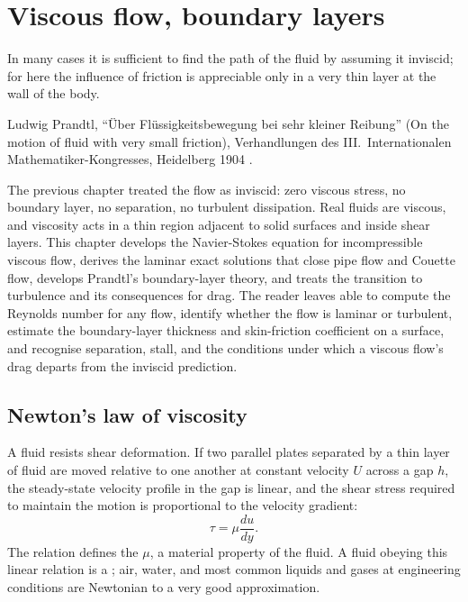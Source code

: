 \chapter{Viscous flow, boundary layers}
\label{vol03:ch12}

\epigraph{In many cases it is sufficient to find the path of the
fluid by assuming it inviscid; for here the influence of friction
is appreciable only in a very thin layer at the wall of the body.}{
Ludwig Prandtl, ``\"Uber Fl\"ussigkeitsbewegung bei sehr kleiner
Reibung'' (On the motion of fluid with very small friction),
Verhandlungen des III.\ Internationalen Mathematiker-Kongresses,
Heidelberg 1904 \cite[pp.~484--485]{paper:prandtl1904}.}


\noindent
The previous chapter treated the flow as inviscid: zero viscous
stress, no boundary layer, no separation, no turbulent dissipation.
Real fluids are viscous, and viscosity acts in a thin region
adjacent to solid surfaces and inside shear layers. This chapter
develops the Navier-Stokes equation for incompressible viscous
flow, derives the laminar exact solutions that close pipe flow
and Couette flow, develops Prandtl's boundary-layer theory, and
treats the transition to turbulence and its consequences for drag.
The reader leaves able to compute the Reynolds number for any
flow, identify whether the flow is laminar or turbulent, estimate
the boundary-layer thickness and skin-friction coefficient on a
surface, and recognise separation, stall, and the conditions under
which a viscous flow's drag departs from the inviscid prediction.

\section{Newton's law of viscosity}

A fluid resists shear deformation. If two parallel plates separated
by a thin layer of fluid are moved relative to one another at
constant velocity $U$ across a gap $h$, the steady-state velocity
profile in the gap is linear, and the shear stress required to
maintain the motion is proportional to the velocity gradient:
\[
\tau = \mu \frac{du}{dy}.
\]
The relation defines the  $\mu$, a
material property of the fluid. A fluid obeying this linear
relation is a ; air, water, and most
common liquids and gases at engineering conditions are Newtonian to
a very good approximation.

